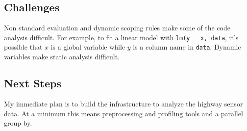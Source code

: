 \documentclass[12pt]{article}
\begin{document}
\subsection{Challenges}

Non standard evaluation and dynamic scoping rules make some of the
code analysis difficult. For example, to fit a linear model with
\texttt{lm(y ~ x, data}, it's possible that $x$ is a global variable while
$y$ is a column name in \texttt{data}.
Dynamic variables make static analysis difficult.

\subsection{Next Steps}

My immediate plan is to build the infrastructure to analyze the highway
sensor data. At a minimum this means preprocessing and profiling tools and
a parallel group by.


 
\end{document}
